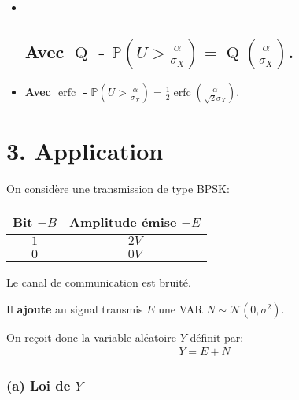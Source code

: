 \documentclass[11pt]{article}
\begin{document}
    \begin{itemize}
\item ~
  \hypertarget{avec-operatornameq---mathbbpleftu-fracalphasigma_xright-operatornameqleftfracalphasigma_xright.}{%
  \subsection{\texorpdfstring{\textbf{Avec \(\operatorname{Q}\) -}
  \(\mathbb{P}\left(U > \frac{\alpha}{\sigma_X}\right) = \operatorname{Q}\left(\frac{\alpha}{\sigma_X}\right)\).}{Avec \textbackslash operatorname\{Q\} - \textbackslash mathbb\{P\}\textbackslash left(U \textgreater{} \textbackslash frac\{\textbackslash alpha\}\{\textbackslash sigma\_X\}\textbackslash right) = \textbackslash operatorname\{Q\}\textbackslash left(\textbackslash frac\{\textbackslash alpha\}\{\textbackslash sigma\_X\}\textbackslash right).}}\label{avec-operatornameq---mathbbpleftu-fracalphasigma_xright-operatornameqleftfracalphasigma_xright.}}
\item
  \textbf{Avec \(\operatorname{erfc}\) -}
  \(\mathbb{P}\left(U > \frac{\alpha}{\sigma_X}\right) = \frac{1}{2}\operatorname{erfc}\left(\frac{\alpha}{\sqrt{2}\sigma_X}\right)\).
\end{itemize}

    \hypertarget{application}{%
\section{3. Application}\label{application}}

On considère une transmission de type BPSK:

\begin{longtable}[]{@{}cc@{}}
\toprule
Bit \(-B\) & Amplitude émise \(-E\)\tabularnewline
\midrule
\endhead
\(1\) & \(2 V\)\tabularnewline
\(0\) & \(0 V\)\tabularnewline
\bottomrule
\end{longtable}

Le canal de communication est bruité.

Il \textbf{ajoute} au signal transmis \(E\) une VAR
\(N\sim\mathcal{N}(0,\sigma^2)\).

On reçoit donc la variable aléatoire \(Y\) définit par: \begin{align}
    Y = E + N
\end{align}

    \hypertarget{a-loi-de-y}{%
\subsubsection{\texorpdfstring{(a) Loi de
\(Y\)}{(a) Loi de Y}}\label{a-loi-de-y}}
\end{document}
